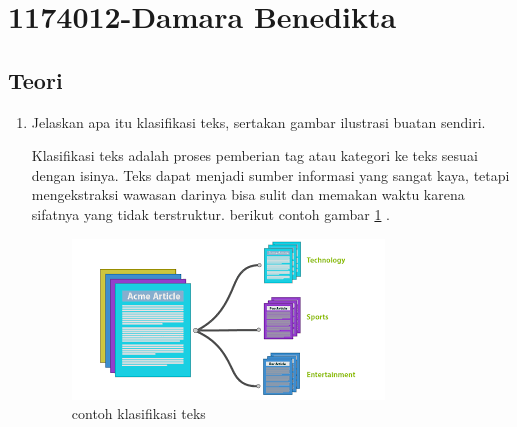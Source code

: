 \section{1174012-Damara Benedikta}

\subsection{Teori}
\begin{enumerate}
\item Jelaskan apa itu klasifikasi teks, sertakan gambar ilustrasi buatan sendiri.
\par Klasiﬁkasi teks adalah proses pemberian tag atau kategori ke teks sesuai dengan isinya. Teks dapat menjadi sumber informasi yang sangat kaya, tetapi mengekstraksi wawasan darinya bisa sulit dan memakan waktu karena sifatnya yang tidak terstruktur. berikut contoh gambar \ref{klasifikasi teks} .
\begin{figure}[H]
\centering
\includegraphics[scale=0.2]{figures/1174012/chapter4/1.png}
\caption{contoh klasifikasi teks}
\label{klasifikasi teks}
\end{figure}


\end{enumerate}
